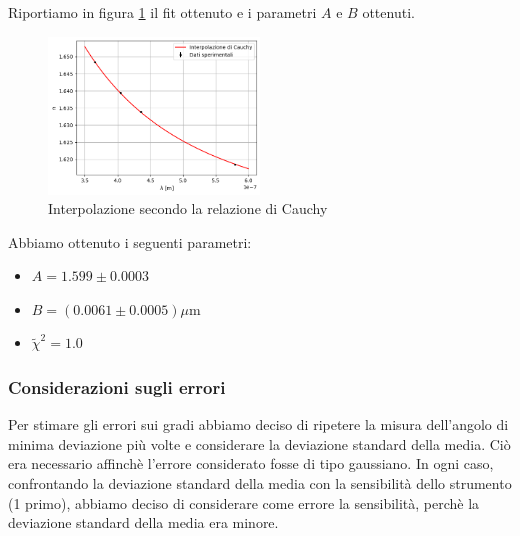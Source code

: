 \documentclass[letterpaper,12pt]{article}
\begin{document}
Riportiamo in figura \ref{fig:Cauchy_fit} il fit ottenuto e i parametri $A$ e $B$ ottenuti.
\begin{figure}[h!]
    \centering
    \includegraphics[width = 0.5\textwidth]{Cauchy_fit.png}
    \caption{Interpolazione secondo la relazione di Cauchy}
    \label{fig:Cauchy_fit}
\end{figure}

Abbiamo ottenuto i seguenti parametri:
\begin{itemize}
    \item $A = 1.599 \pm 0.0003$
    \item $B = (0.0061 \pm 0.0005) \mu$m
    \item $\tilde{\chi}^2 = 1.0$
\end{itemize}

\subsubsection{Considerazioni sugli errori}
Per stimare gli errori sui gradi abbiamo deciso di ripetere la misura dell'angolo di minima deviazione più volte e 
considerare la deviazione standard della media. Ciò era necessario affinchè l'errore considerato fosse di tipo gaussiano. 
In ogni caso, confrontando la deviazione standard della media con la sensibilità dello strumento (1 primo), 
abbiamo deciso di considerare come errore la sensibilità, perchè la deviazione standard della media era minore.
\end{document}
